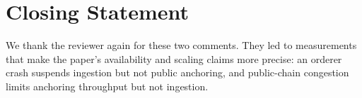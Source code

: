 \documentclass[11pt]{article}
\newcounter{reviewer}
\begin{document}
\section*{Closing Statement}

We thank the reviewer again for these two comments. They led to measurements that make the paper's availability and scaling claims more precise: an orderer crash suspends ingestion but not public anchoring, and public-chain congestion limits anchoring throughput but not ingestion.
\end{document}
